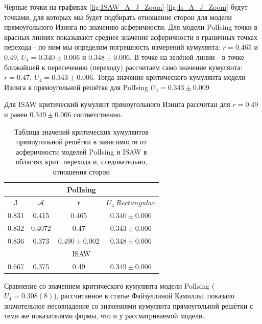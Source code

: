 \newpage

Чёрные точки на графиках \ref{fig:ISAW_A_J_Zoom}-\ref{fig:Is_A_J_Zoom} будут точками, для которых мы будет подбирать отношение сторон для модели прямоугольного Изинга по значению асферичности. Для модели PolIsing точки в красных линиях показывают среднее значение асферичности в граничных точках перехода - по ним мы определим погрешность измерений кумулянта: $r = 0.465$ и $0.49$, $U_{4} = 0.340\pm0.006$ и $0.348\pm0.006$. В точке на зелёной линии - в точке ближайшей к пересечению (переходу) рассчитаем само значение кумулянта: $r = 0.47,\ U_{4} = 0.343\pm0.006$. Тогда значение критического кумулянта модели Изинга в прямоугольной решётке для PolIsing $U_{4} = 0.343\pm0.009$

Для ISAW критический кумулянт прямоугольного Изинга рассчитан для $r=0.49$ и равен $0.349 \pm 0.006$ соответственно.

\begin{table}[h!]
    \centering
    \begin{tabular}{|c|c|c|c|}
        \hline
         \multicolumn{4}{|c|}{PolIsing}  \\ \hline
         J & $\mathcal{A}$ & r & $U_{4}\  Rectangular$ \\ \hline
         0.831 & 0.415 & 0.465 & $0.340 \pm 0.006$\\ \hline
         0.832 & 0.4072 & 0.47 & $0.343 \pm 0.006$\\ \hline
         0.836 & 0.373 & $0.490 \pm 0.002$ & $0.348 \pm 0.006$\\ \hline
         \multicolumn{4}{|c|}{ISAW} \\ \hline
         0.667 & 0.375 & 0.49 & $0.349 \pm 0.006$ \\ \hline
    \end{tabular}
    \caption{Таблица значений критических кумулянтов прямоугольной решётки в зависимости от асферичности моделей PolIsing и ISAW в областях крит. перехода и, следовательно, отношения сторон}
    \label{tab:my_label}
\end{table}

Сравнение со значением критического кумулянта модели PolIsing ($U_{4} = 0.308(8)$\cite{faizullina2021critical}), рассчитанное в статье Файзуллиной Камиллы, показало значительное несовпадение со значениями кумулянта прямоугольной решётки с теми же показателями формы, что и у рассматриваемой модели. 